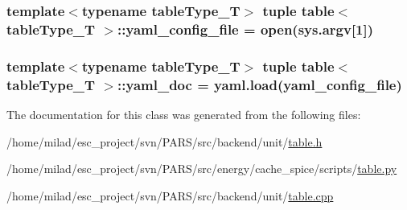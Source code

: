 \hypertarget{classtable_af711f0fa04be7ff6e233884b184cb339}{
\subsubsection[{yaml\_\-config\_\-file}]{\setlength{\rightskip}{0pt plus 5cm}template$<$typename tableType\_\-T$>$ tuple {\bf table}$<$ tableType\_\-T $>$::{\bf yaml\_\-config\_\-file} = open(sys.argv\mbox{[}1\mbox{]})}}
\label{classtable_af711f0fa04be7ff6e233884b184cb339}
\hypertarget{classtable_a068029d2d6ede2fab66a603c83626ed1}{
\subsubsection[{yaml\_\-doc}]{\setlength{\rightskip}{0pt plus 5cm}template$<$typename tableType\_\-T$>$ tuple {\bf table}$<$ tableType\_\-T $>$::{\bf yaml\_\-doc} = yaml.load({\bf yaml\_\-config\_\-file})}}
\label{classtable_a068029d2d6ede2fab66a603c83626ed1}


The documentation for this class was generated from the following files:\begin{DoxyCompactItemize}
\item 
/home/milad/esc\_\-project/svn/PARS/src/backend/unit/\hyperlink{table_8h}{table.h}\item 
/home/milad/esc\_\-project/svn/PARS/src/energy/cache\_\-spice/scripts/\hyperlink{table_8py}{table.py}\item 
/home/milad/esc\_\-project/svn/PARS/src/backend/unit/\hyperlink{table_8cpp}{table.cpp}\end{DoxyCompactItemize}
